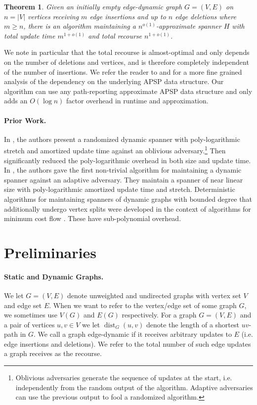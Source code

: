 \documentclass[11pt]{article}
\newtheorem{theorem}{Theorem}[section]
\DeclareMathOperator{\dist}{dist}
\begin{document}
\begin{theorem}  \label{thm:main}
    Given an initially empty edge-dynamic graph $G = (V, E)$ on $n = |V|$ vertices receiving $m$ edge insertions and up to $n$ edge deletions where $m \geq n$, there is an algorithm maintaining a  $n^{o(1)}$-approximate spanner $H$ with total update time $m^{1 + o(1)}$ and total recourse $n^{1 + o(1)}$. 
\end{theorem}

We note in particular that the total recourse is almost-optimal and only depends on the number of deletions and vertices, and is therefore completely independent of the number of insertions. We refer the reader to  and  for a more fine grained analysis of the dependency on the underlying APSP data structure. 
Our algorithm can use any path-reporting approximate APSP data structure and only adds an $O(\log n)$ factor overhead in runtime and approximation.

\paragraph{Prior Work. } In \cite{rand_spanner}, the authors present a randomized dynamic spanner with poly-logarithmic stretch and amortized update time against an oblivious adversary.\footnote{Oblivious adversaries generate the sequence of updates at the start, i.e. independently from the random output of the algorithm. Adaptive adversaries can use the previous output to fool a randomized algorithm. } Then \cite{forster19} significantly reduced the poly-logarithmic overhead in both size and update time. In \cite{bernstein_et_al:LIPIcs.ICALP.2022.20}, the authors gave the first non-trivial algorithm for maintaining a dynamic spanner against an adaptive adversary. They maintain a spanner of near linear size with poly-logarithmic amortized update time and stretch. Deterministic algorithms for maintaining spanners of dynamic graphs with bounded degree that additionally undergo vertex splits were developed in the context of algorithms for minimum cost flow \cite{maxflow, detmax, CKL24}. These have sub-polynomial overhead.  

\section{Preliminaries}

\paragraph{Static and Dynamic Graphs.} We let $G = (V, E)$ denote unweighted and undirected graphs with vertex set $V$ and edge set $E$. When we want to refer to the vertex/edge set of some graph $G$, we sometimes use $V(G)$ and $E(G)$ respectively. 
For a graph $G = (V, E)$ and a pair of vertices $u,v \in V$ we let $\dist_G(u, v)$ denote the length of a shortest $uv$-path in $G$. 
We call a graph edge-dynamic if it receives arbitrary updates to $E$ (i.e. edge insertions and deletions). We refer to the total number of such edge updates a graph receives as the recourse. 
\end{document}
